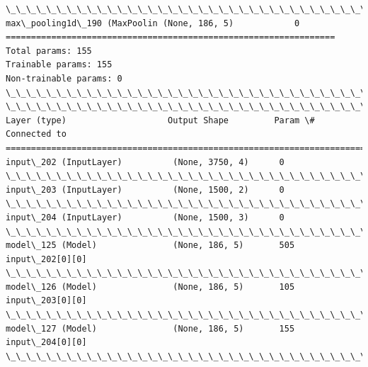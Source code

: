 \documentclass[11pt]{article}
\begin{document}
\begin{Verbatim}[commandchars=\\\{\}]
\_\_\_\_\_\_\_\_\_\_\_\_\_\_\_\_\_\_\_\_\_\_\_\_\_\_\_\_\_\_\_\_\_\_\_\_\_\_\_\_\_\_\_\_\_\_\_\_\_\_\_\_\_\_\_\_\_\_\_\_\_\_\_\_\_
max\_pooling1d\_190 (MaxPoolin (None, 186, 5)            0         
=================================================================
Total params: 155
Trainable params: 155
Non-trainable params: 0
\_\_\_\_\_\_\_\_\_\_\_\_\_\_\_\_\_\_\_\_\_\_\_\_\_\_\_\_\_\_\_\_\_\_\_\_\_\_\_\_\_\_\_\_\_\_\_\_\_\_\_\_\_\_\_\_\_\_\_\_\_\_\_\_\_
\_\_\_\_\_\_\_\_\_\_\_\_\_\_\_\_\_\_\_\_\_\_\_\_\_\_\_\_\_\_\_\_\_\_\_\_\_\_\_\_\_\_\_\_\_\_\_\_\_\_\_\_\_\_\_\_\_\_\_\_\_\_\_\_\_\_\_\_\_\_\_\_\_\_\_\_\_\_\_\_\_\_\_\_\_\_\_\_\_\_\_\_\_\_\_\_\_\_
Layer (type)                    Output Shape         Param \#     Connected to                     
==================================================================================================
input\_202 (InputLayer)          (None, 3750, 4)      0                                            
\_\_\_\_\_\_\_\_\_\_\_\_\_\_\_\_\_\_\_\_\_\_\_\_\_\_\_\_\_\_\_\_\_\_\_\_\_\_\_\_\_\_\_\_\_\_\_\_\_\_\_\_\_\_\_\_\_\_\_\_\_\_\_\_\_\_\_\_\_\_\_\_\_\_\_\_\_\_\_\_\_\_\_\_\_\_\_\_\_\_\_\_\_\_\_\_\_\_
input\_203 (InputLayer)          (None, 1500, 2)      0                                            
\_\_\_\_\_\_\_\_\_\_\_\_\_\_\_\_\_\_\_\_\_\_\_\_\_\_\_\_\_\_\_\_\_\_\_\_\_\_\_\_\_\_\_\_\_\_\_\_\_\_\_\_\_\_\_\_\_\_\_\_\_\_\_\_\_\_\_\_\_\_\_\_\_\_\_\_\_\_\_\_\_\_\_\_\_\_\_\_\_\_\_\_\_\_\_\_\_\_
input\_204 (InputLayer)          (None, 1500, 3)      0                                            
\_\_\_\_\_\_\_\_\_\_\_\_\_\_\_\_\_\_\_\_\_\_\_\_\_\_\_\_\_\_\_\_\_\_\_\_\_\_\_\_\_\_\_\_\_\_\_\_\_\_\_\_\_\_\_\_\_\_\_\_\_\_\_\_\_\_\_\_\_\_\_\_\_\_\_\_\_\_\_\_\_\_\_\_\_\_\_\_\_\_\_\_\_\_\_\_\_\_
model\_125 (Model)               (None, 186, 5)       505         input\_202[0][0]                  
\_\_\_\_\_\_\_\_\_\_\_\_\_\_\_\_\_\_\_\_\_\_\_\_\_\_\_\_\_\_\_\_\_\_\_\_\_\_\_\_\_\_\_\_\_\_\_\_\_\_\_\_\_\_\_\_\_\_\_\_\_\_\_\_\_\_\_\_\_\_\_\_\_\_\_\_\_\_\_\_\_\_\_\_\_\_\_\_\_\_\_\_\_\_\_\_\_\_
model\_126 (Model)               (None, 186, 5)       105         input\_203[0][0]                  
\_\_\_\_\_\_\_\_\_\_\_\_\_\_\_\_\_\_\_\_\_\_\_\_\_\_\_\_\_\_\_\_\_\_\_\_\_\_\_\_\_\_\_\_\_\_\_\_\_\_\_\_\_\_\_\_\_\_\_\_\_\_\_\_\_\_\_\_\_\_\_\_\_\_\_\_\_\_\_\_\_\_\_\_\_\_\_\_\_\_\_\_\_\_\_\_\_\_
model\_127 (Model)               (None, 186, 5)       155         input\_204[0][0]                  
\_\_\_\_\_\_\_\_\_\_\_\_\_\_\_\_\_\_\_\_\_\_\_\_\_\_\_\_\_\_\_\_\_\_\_\_\_\_\_\_\_\_\_\_\_\_\_\_\_\_\_\_\_\_\_\_\_\_\_\_\_\_\_\_\_\_\_\_\_\_\_\_\_\_\_\_\_\_\_\_\_\_\_\_\_\_\_\_\_\_\_\_\_\_\_\_\_\_

\end{Verbatim}
\end{document}
